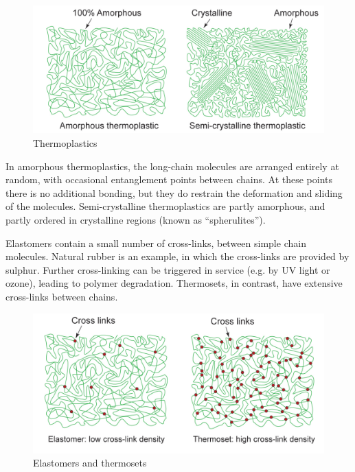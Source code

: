 \documentclass{article}
\begin{document}
\begin{figure}[h]
    \centering
    \includegraphics{images/mat14.png}
    \caption{Thermoplastics}
    \label{fig:enter-label}
\end{figure}

In amorphous thermoplastics, the long-chain molecules are arranged entirely at random, with occasional entanglement points between chains. At these points there is no additional bonding, but they do restrain the deformation and sliding of the molecules. Semi-crystalline thermoplastics are partly amorphous, and partly ordered in crystalline regions (known as “spherulites”).

\begin{definition}
    Elastomers contain a small number of cross-links, between simple chain molecules. Natural rubber is an example, in which the cross-links are provided by sulphur. Further cross-linking can be triggered in service (e.g. by UV light or ozone), leading to polymer degradation. Thermosets, in contrast, have extensive cross-links between chains.
\end{definition}

\begin{figure}[h]
    \centering
    \includegraphics{images/mat15.png}
    \caption{Elastomers and thermosets}
    \label{fig:enter-label}
\end{figure}
\end{document}

